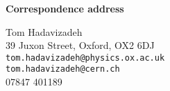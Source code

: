 
%




\begin{alwayssingle} 
 \thispagestyle{empty}
 \begin{center}
   \vspace*{1.5cm}
   {\Large \bfseries  Correspondence address}
 \end{center}
 \vspace{0.5cm}
Tom Hadavizadeh\\
39 Juxon Street, Oxford, OX2 6DJ\\
\texttt{tom.hadavizadeh@physics.ox.ac.uk}\\
\texttt{tom.hadavizadeh@cern.ch}\\
07847 401189\\
 
\end{alwayssingle}



